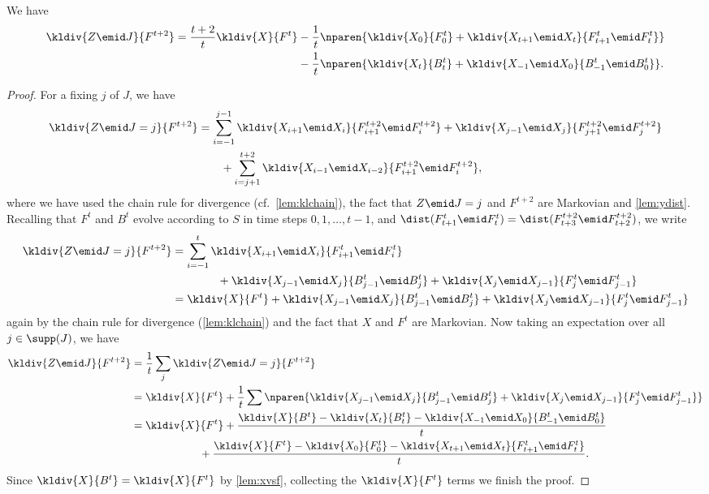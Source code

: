 \begin{lemma}
\label{lem:zdiv}
We have
\begin{align*}
\kldiv{Z\emid J}{F^{t+2}} = \frac{t+2}{t}\kldiv{X}{F^t} 
  &- \frac{1}{t}\nparen{
    \kldiv{X_0}{F^t_0} + 
    \kldiv{X_{t+1}\emid X_{t}}{F^t_{t+1}\emid F^t_t}
  }\\
  &- \frac{1}{t}\nparen{
    \kldiv{X_t}{B^t_t} + 
    \kldiv{X_{-1}\emid X_{0}}{B^t_{-1}\emid B^t_0}
  }.
\end{align*}
\end{lemma}
\begin{proof}
For a fixing $j$ of $J$, we have 
\begin{align*}
\kldiv{Z\emid J=j}{F^{t+2}} 
    &= \sum_{i=-1}^{j-1}\kldiv{X_{i+1} \emid X_{i}}
        {F^{t+2}_{i+1} \emid F^{t+2}_{i}}
    + \kldiv{X_{j-1}\emid X_j}{F^{t+2}_{j+1}
                    \emid F^{t+2}_{j}}\\
    &\quad\quad
        + \sum_{i=j+1}^{t+2}\kldiv{X_{i-1}\emid X_{i-2}}
      {F^{t+2}_{i+1}\emid F^{t+2}_{i}},
\end{align*}
where we have used the chain rule for divergence (cf.\ 
\autoref{lem:klchain}), the fact that $Z\emid J=j$ and 
$F^{t+2}$ are Markovian and \autoref{lem:ydist}. 
Recalling that $F^t$ and $B^t$ evolve according 
to $S$ in time steps $0,1,\ldots,t-1$, and 
$\dist(F^t_{t+1}\emid F^t_t)
    =\dist(F^{t+2}_{t+3}\emid F^{t+2}_{t+2})$,
we write
\begin{align*}
\kldiv{Z\emid J=j}{F^{t+2}}
  &= \sum_{i=-1}^t \kldiv{X_{i+1}\emid X_i}{F^t_{i+1}\emid F^t_i}\\
     &\qquad\qquad
     + \kldiv{X_{j-1}\emid X_j}{B^t_{j-1}\emid B^t_{j}}
     + \kldiv{X_j\emid X_{j-1}}{F^t_{j}\emid F^t_{j-1}}\\
  &= \kldiv{X}{F^t} 
    + \kldiv{X_{j-1}\emid X_j}{B^t_{j-1}\emid B^t_{j}}
    + \kldiv{X_j\emid X_{j-1}}{F^t_{j}\emid F^t_{j-1}}
\end{align*}
again by the chain rule for divergence 
(\autoref{lem:klchain}) and the
fact that $X$ and $F^t$ are Markovian. Now taking 
an expectation over all $j\in \supp(J)$, we have
\begin{align*}
\kldiv{Z\emid J}{F^{t+2}} 
  &= \frac{1}{t}\sum_j\kldiv{Z\emid J=j}{F^{t+2}}\\
  &= \kldiv{X}{F^t} 
    + \frac{1}{t}\sum\nparen{\kldiv{X_{j-1}\emid X_j}
                            {B^t_{j-1}\emid B^t_{j}}
    + \kldiv{X_j\emid X_{j-1}}{F^t_{j}\emid F^t_{j-1}}}\\
  &= \kldiv{X}{F^t}
  + \frac{\kldiv{X}{B^t} 
      - \kldiv{X_t}{B^t_t}
      - \kldiv{X_{-1}\emid X_0}{B^t_{-1}\emid B^t_0}
    }{t}\\
  &\qquad\qquad\qquad\;+ \frac{\kldiv{X}{F^t} 
      - \kldiv{X_0}{F^t_0}
      - \kldiv{X_{t+1}\emid X_t}{F^t_{t+1}\emid F^t_t}
    }{t}.
\end{align*}
Since $\kldiv{X}{B^t} = \kldiv{X}{F^t}$ by 
\autoref{lem:xvsf}, collecting the $\kldiv{X}{F^t}$
terms we finish the proof.
\end{proof}

